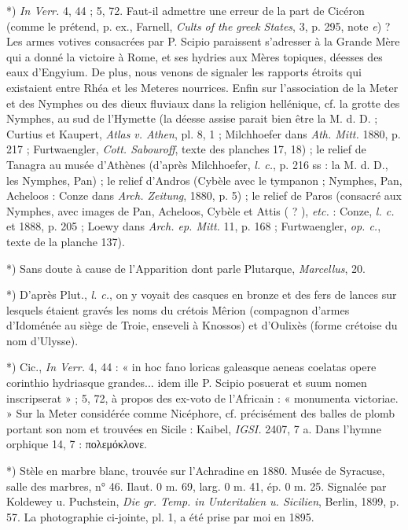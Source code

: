 \documentclass[a4paper, 11pt, oneside, polutonikogreek, french]{article}
\begin{document}
*) \emph{In Verr.} 4, 44 ; 5, 72. Faut-il admettre une erreur de la part de Cicéron (comme le prétend, p. ex., Farnell, \emph{Cults of the greek States}, 3, p. 295, note \emph{e}) ? Les armes votives consacrées par P. Scipio paraissent s'adresser à la Grande Mère qui a donné la victoire à Rome, et ses hydries aux Mères topiques, déesses des eaux d'Engyium. De plus, nous venons de signaler les rapports étroits qui existaient entre Rhéa et les Meteres nourrices. Enfin sur l'association de la Meter et des Nymphes ou des dieux fluviaux dans la religion hellénique, cf. la grotte des Nymphes, au sud de l'Hymette (la déesse assise parait bien être la M. d. D. ; Curtius et Kaupert, \emph{Atlas v. Athen}, pl. 8, 1 ; Milchhoefer dans \emph{Ath. Mitt.} 1880, p. 217 ; Furtwaengler, \emph{Cott. Sabouroff}, texte des planches 17, 18) ; le relief de Tanagra au musée d'Athènes (d'après Milchhoefer, \emph{l. c.}, p. 216 ss : la M. d. D., les Nymphes, Pan) ; le relief d'Andros (Cybèle avec le tympanon ; Nymphes, Pan, Acheloos : Conze dans \emph{Arch. Zeitung}, 1880, p. 5) ; le relief de Paros (consacré aux Nymphes, avec images de Pan, Acheloos, Cybèle et Attis ( ? ), \emph{etc.} : Conze, \emph{l. c.} et 1888, p. 205 ; Loewy dans \emph{Arch. ep. Mitt.} 11, p. 168 ; Furtwaengler, \emph{op. c.}, texte de la planche 137).

*) Sans doute à cause de l'Apparition dont parle Plutarque, \emph{Marcellus}, 20.

*) D'après Plut., \emph{l. c.}, on y voyait des casques en bronze et des fers de lances sur lesquels étaient gravés les noms du crétois Mêrion (compagnon d'armes d'Idoménée au siège de Troie, enseveli à Knossos) et d'Oulixès (forme crétoise du nom d'Ulysse).

*) Cic., \emph{In Verr.} 4, 44 : « in hoc fano loricas galeasque aeneas coelatas opere corinthio hydriasque grandes... idem ille P. Scipio posuerat et suum nomen inscripserat » ; 5, 72, à propos des ex-voto de l'Africain : « monumenta victoriae. » Sur la Meter considérée comme Nicéphore, cf. précisément des balles de plomb portant son nom et trouvées en Sicile : Kaibel, \emph{IGSI.} 2407, 7 a. Dans l'hymne orphique 14, 7 : πολεμόκλονε.

*) Stèle en marbre blanc, trouvée sur l'Achradine en 1880. Musée de Syracuse, salle des marbres, n° 46. Ilaut. 0 m. 69, larg. 0 m. 41, ép. 0 m. 25. Signalée par Koldewey u. Puchstein, \emph{Die gr. Temp. in Unteritalien u. Sicilien}, Berlin, 1899, p. 57. La photographie ci-jointe, pl. 1, a été prise par moi en 1895.
\end{document}
